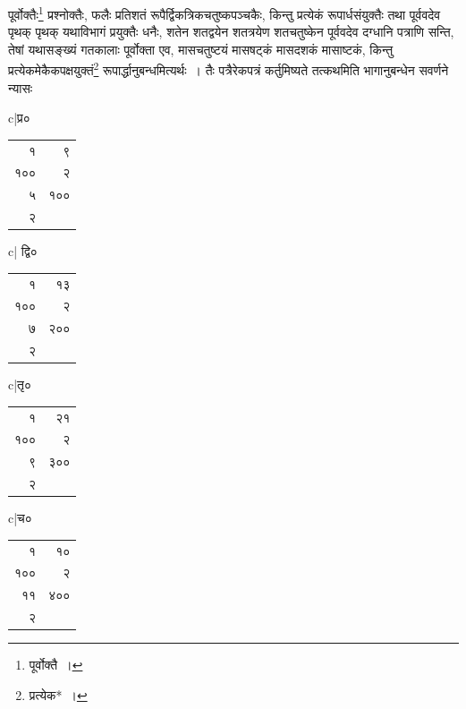\documentclass[10pt, openany]{book}
\begin{document}
{{{{{पूर्वोक्तैः\renewcommand{\thefootnote}{\s २}\footnote{\s पूर्वोक्तै~।}  प्रश्नोक्तैः, फलैः प्रतिशतं
रूपैर्द्विकत्रिकचतुष्कपञ्चकैः, किन्तु प्रत्येकं रूपार्धसंयुक्तैः} 
{तथा पूर्ववदेव पृथक् पृथक् यथाविभागं प्रयुक्तैः धनैः, शतेन शतद्वयेन
शतत्रयेण शतचतुष्केन}
{पूर्ववदेव दग्धानि पत्राणि सन्ति, तेषां यथासङ्ख्यं गतकालाः पूर्वोक्ता
एव, मासचतुष्टयं मासषट्कं मासदशकं मासाष्टकं, किन्तु प्रत्येकमेकैकपक्षयुक्तं\renewcommand{\thefootnote}{\s ३}\footnote{\s प्रत्येक*~।} 
रूपार्द्धानुबन्धमित्यर्थः~। तैः पत्रैरेकपत्रं}
{कर्तुमिष्यते तत्कथमिति भागानुबन्धेन सवर्णने न्यासः\textemdash} 

\begin{center}

\begin{tabular}{c|}प्र० \\ \begin{tabular}{r|r}१ & ९\\१०० & २\\५ & १००\\२ & \end{tabular}
\end{tabular}\begin{tabular}{c|} द्वि० \\ \begin{tabular}{r|r}१ &१३ \\१०० & २\\७ & २००\\२ & \end{tabular}\end{tabular}\begin{tabular}{c|}तृ०\\ \begin{tabular}{r|r}१ & २१ \\१०० & २\\९ & ३००\\२ & \end{tabular}
\end{tabular}\begin{tabular}{c|}च० \\ \begin{tabular}{r|r}१ & १०\\१०० & २\\११ & ४००\\२ & \end{tabular}\end{tabular}
\end{center}

}}}}
\end{document}
